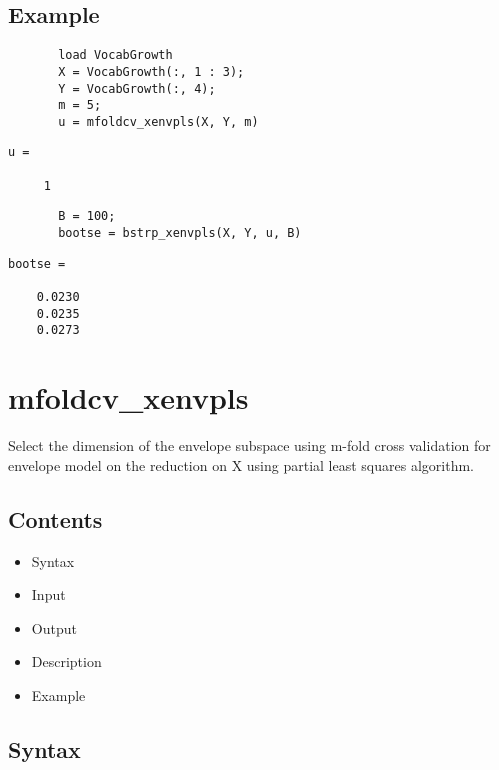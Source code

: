 \documentclass[a4paper,11pt,openany]{memoir}
\begin{document}
\subsection*{Example}


\begin{verbatim}       load VocabGrowth
       X = VocabGrowth(:, 1 : 3);
       Y = VocabGrowth(:, 4);
       m = 5;
       u = mfoldcv_xenvpls(X, Y, m)\end{verbatim}
               \color{lightgray} \ttfamily\begin{verbatim}
u =

     1
     \end{verbatim} \rmfamily
     \color{black}
\begin{verbatim}       B = 100;
       bootse = bstrp_xenvpls(X, Y, u, B)\end{verbatim}
    
        \color{lightgray} \ttfamily\begin{verbatim}
bootse =

    0.0230
    0.0235
    0.0273

\end{verbatim} \rmfamily\color{black}

\newpage
\rmfamily
\color{black}\section{mfoldcv\_xenvpls}

\begin{par}
Select the dimension of the envelope subspace using m-fold cross validation for envelope model on the reduction on X using partial least squares algorithm.
\end{par} \vspace{1em}

\subsection*{Contents}

\begin{itemize}
\setlength{\itemsep}{-1ex}
   \item Syntax
   \item Input
   \item Output
   \item Description
   \item Example
\end{itemize}


\subsection*{Syntax}
\end{document}
